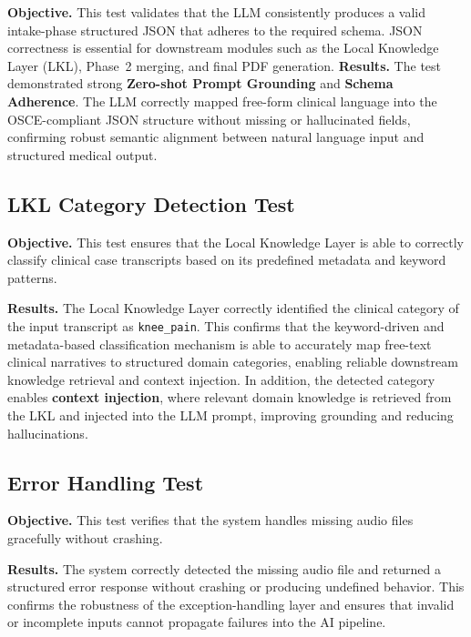 \textbf{Objective.}
This test validates that the LLM consistently produces a valid intake-phase structured JSON
that adheres to the required schema. JSON correctness is essential for downstream modules
such as the Local Knowledge Layer (LKL), Phase~2 merging, and final PDF generation.
\textbf{Results.}
The test demonstrated strong \textbf{Zero-shot Prompt Grounding} and \textbf{Schema Adherence}. 
The LLM correctly mapped free-form clinical language into the OSCE-compliant JSON structure 
without missing or hallucinated fields, confirming robust semantic alignment between 
natural language input and structured medical output.





\subsection{LKL Category Detection Test}
\label{sec:testing:category}

\textbf{Objective.}
This test ensures that the Local Knowledge Layer is able to correctly classify clinical case
transcripts based on its predefined metadata and keyword patterns.

\textbf{Results.}
The Local Knowledge Layer correctly identified the clinical category of the input transcript
as \texttt{knee\_pain}. This confirms that the keyword-driven and metadata-based classification
mechanism is able to accurately map free-text clinical narratives to structured domain
categories, enabling reliable downstream knowledge retrieval and context injection.
In addition, the detected category enables \textbf{context injection}, where relevant domain knowledge
is retrieved from the LKL and injected into the LLM prompt, improving grounding and reducing hallucinations.




\subsection{Error Handling Test}
\label{sec:testing:error}

\textbf{Objective.}
This test verifies that the system handles missing audio files gracefully without crashing.

\textbf{Results.}
The system correctly detected the missing audio file and returned a structured error
response without crashing or producing undefined behavior. This confirms the robustness
of the exception-handling layer and ensures that invalid or incomplete inputs cannot
propagate failures into the AI pipeline.




